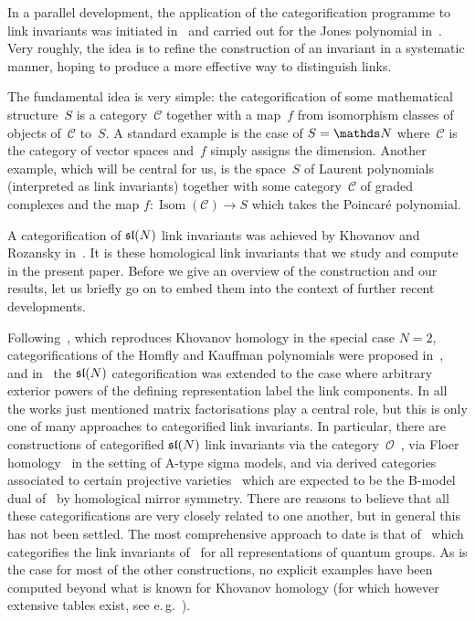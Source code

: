 \documentclass{compositio}
\theoremstyle{definition}
\numberwithin{equation}{section}
\begin{document}
\medskip

In a parallel development, the application of the categorification programme to link invariants was initiated in~\cite{cf9405183} and carried out for the Jones polynomial in~\cite{k9908171}. Very roughly, the idea is to refine the construction of an invariant in a systematic manner, hoping to produce a more effective way to distinguish links. 

The fundamental idea is very simple: the categorification of some mathematical structure~$S$ is a category~$\mathcal C$ together with a map~$f$ from isomorphism classes of objects of~$\mathcal C$ to~$S$. A standard example is the case of $S=\nN$ where~$\mathcal C$ is the category of vector spaces and~$f$ simply assigns the dimension. Another example, which will be central for us, is the space~$S$ of Laurent polynomials (interpreted as link invariants) together with some category~$\mathcal C$ of graded complexes and the map $f:\operatorname{Isom}(\mathcal C)\longrightarrow S$ which takes the Poincar\'e polynomial. 

A categorification of $\mathfrak{sl}(N)$ link invariants was achieved by Khovanov and Rozansky in~\cite{kr0401268}. It is these homological link invariants that we study and compute in the present paper. Before we give an overview of the construction and our results, let us briefly go on to embed them into the context of further recent developments. 

Following~\cite{kr0401268}, which reproduces Khovanov homology in the special case $N=2$, categorifications of the Homfly and Kauffman polynomials were proposed in~\cite{kr0505056, kr0701333}, and in~\cite{y0906.0220, w0907.0695} the $\mathfrak{sl}(N)$ categorification was extended to the case where arbitrary exterior powers of the defining representation label the link components. In all the works just mentioned matrix factorisations play a central role, but this is only one of many approaches to categorified link invariants. In particular, there are constructions of categorified $\mathfrak{sl}(N)$ link invariants via the category~$\mathcal O$~\cite{sCatTLcTCpf, ms0709.1971, s0701045}, via Floer homology~\cite{ss0405089, m0601629} in the setting of A-type sigma models, and via derived categories associated to certain projective varieties~\cite{ck0701194, ck0710.3216} which are expected to be the B-model dual of~\cite{ss0405089, m0601629} by homological mirror symmetry. There are reasons to believe that all these categorifications are very closely related to one another, but in general this has not been settled. The most comprehensive approach to date is that of~\cite{w1005.4559} which categorifies the link invariants of~\cite{RT1990, RT1991} for all representations of quantum groups. As is the case for most of the other constructions, no explicit examples have been computed beyond what is known for Khovanov homology (for which however extensive tables exist, see e.\,g.~\cite{bnKhovanov11crossings}). 
\end{document}
